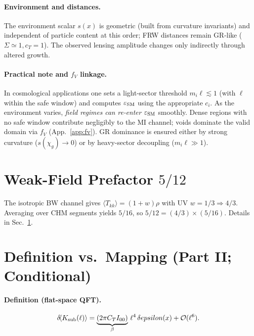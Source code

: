 \documentclass[aps,prd,onecolumn,superscriptaddress,nofootinbib]{revtex4-2}
\def\eps{epsilon}%
\providecommand{\eps}{\varepsilon}
\providecommand{\be}{\begin{equation}}
\providecommand{\ee}{\end{equation}}
\begin{document}
\paragraph{Environment and distances.}
The environment scalar \(s(x)\) is geometric (built from curvature invariants) and independent of particle content at this order; FRW distances remain GR‑like (\(\Sigma\simeq 1, c_T=1\)). The observed lensing amplitude changes only indirectly through altered growth.

\paragraph{Practical note and $f_V$ linkage.}
In cosmological applications one sets a light‑sector threshold \(m_i\ell\lesssim 1\) (with \(\ell\) within the safe window) and computes \(\varepsilon_{\rm SM}\) using the appropriate \(c_i\). As the environment varies, \emph{field regimes can re‑enter} \(\varepsilon_{\rm SM}\) smoothly. Dense regions with no safe window contribute negligibly to the MI channel; voids dominate the valid domain via \(f_V\) (App.~\ref{app:fv}). GR dominance is ensured either by strong curvature (\(s(\chi_g)\!\to\!0\)) or by heavy-sector decoupling (\(m_i\ell\!\gg\!1\)).

\section{Weak-Field Prefactor \texorpdfstring{$5/12$}{5/12}}
\label{sec:five-twelve}
The isotropic BW channel gives \(\langle T_{kk}\rangle=(1+w)\rho\) with UV \(w=1/3\Rightarrow 4/3\).
Averaging over CHM segments yields \(5/16\), so \(5/12=(4/3)\times(5/16)\).
Details in Sec.~\ref{sec:five-twelve}.

\section{Definition vs.\ Mapping (Part II; Conditional)}
\label{sec:def-vs-map}

\paragraph{Definition (flat-space QFT).}
\be
\label{eq:eps-def}
\delta\!\langle K_{\rm sub}(\ell)\rangle=\underbrace{(2\pi C_T I_{00})}_{\beta}\,\ell^4\,\delta\eps(x)+\mathcal O(\ell^6).
\ee
\end{document}
